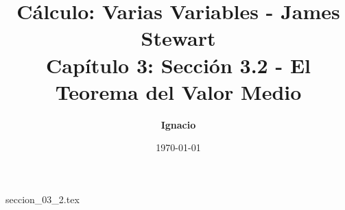 \documentclass[11pt,spanish,oneside]{report}
\title{\textbf{Cálculo: Varias Variables - James Stewart} \\ \Large Capítulo 3: Sección 3.2 - El Teorema del Valor Medio}
\author{\textbf{Ignacio}}
\date{\today}
\begin{document}
\maketitle

{seccion_03_2.tex}
\end{document}
